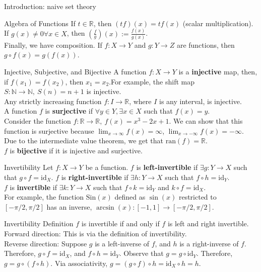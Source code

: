 \documentclass[10pt]{extarticle}
\begin{document}
\begin{problem}{Introduction: naive set theory}
\begin{problem}{Algebra of Functions}
      If $t\in \mathbb{R}$, then $(tf)(x) = tf(x)$ (scalar multiplication). If $g(x)\neq 0\forall x\in X$, then $\left(\frac{f}{g}\right)(x) := \frac{f(x)}{g(x)}$.\\

      Finally, we have composition. If $f:X\rightarrow Y$ and $g:Y\rightarrow Z$ are functions, then $g\circ f(x) = g(f(x))$.
    \end{problem}
    \begin{problem}{Injective, Subjective, and Bijective}
      A function $f:X\rightarrow Y$ is a \textbf{injective} map, then, if $f(x_1) = f(x_2)$, then $x_1 = x_2$.For example, the shift map $S:\mathbb{N} \rightarrow \mathbb{N},~S(n) = n+1$ is injective.\\

      Any strictly increasing function $f:I\rightarrow \mathbb{R}$, where $I$ is any interval, is injective.\\

      A function $f$ is \textbf{surjective} if $\forall y\in Y, \exists x\in X$ such that $f(x) = y$.\\

      Consider the function $f:\mathbb{R} \rightarrow \mathbb{R},~f(x) = x^3-2x+1$. We can show that this function is surjective because $\lim_{x\rightarrow \infty}f(x) = \infty$, $\lim_{x\rightarrow -\infty} f(x) = -\infty$. Due to the intermediate value theorem, we get that $\text{ran}(f) = \mathbb{R}$.\\

      $f$ is \textbf{bijective} if it is injective and surjective.
    \end{problem}
    \begin{problem}{Invertibility}
      Let $f:X\rightarrow Y$ be a function. $f$ is \textbf{left-invertible} if $\exists g:Y\rightarrow X$ such that $g\circ f = \text{id}_X$. $f$ is \textbf{right-invertible} if $\exists h:Y\rightarrow X$ such that $f\circ h = \text{id}_Y$.\\

      $f$ is \textbf{invertible} if $\exists k:Y\rightarrow X$ such that $f\circ k = \text{id}_Y$ and $k\circ f = \text{id}_X$.\\

      For example, the function $\text{Sin}(x)$ defined as $\sin(x)$ restricted to $[-\pi/2,\pi/2]$ has an inverse, $\arcsin(x):[-1,1] \rightarrow [-\pi/2,\pi/2]$.
    \end{problem}
  \end{problem}
  \begin{problem}{Invertibility Definition}
    $f$ is invertible if and only if $f$ is left and right invertible.
    \tcblower
      Forward direction: This is via the definition of invertibility.\\

      Reverse direction: Suppose $g$ is a left-inverse of $f$, and $h$ is a right-inverse of $f$. Therefore, $g\circ f = \text{id}_X$, and $f\circ h = \text{id}_Y$. Observe that $g = g\circ \text{id}_Y$. Therefore, $g = g\circ(f\circ h)$. Via associativity, $g = (g\circ f)\circ h = \text{id}_X \circ h = h$.
  \end{problem}
\end{document}
